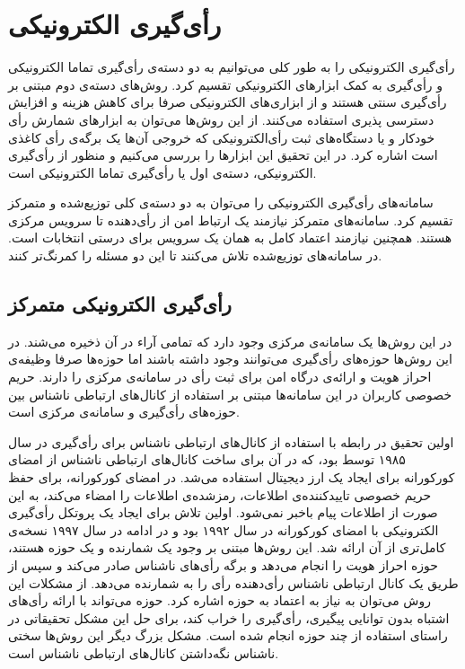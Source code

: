 \section{رأی‌گیری الکترونیکی}
رأی‌گیری الکترونیکی را به طور کلی ‌‌می‌توانیم به دو دسته‌ی رأی‌گیری تماما الکترونیکی و رأی‌گیری به کمک ابزار‌های الکترونیکی تقسیم کرد. روش‌های دسته‌ی دوم مبتنی بر رأی‌گیری سنتی هستند و از ابزاری‌های الکترونیکی صرفا برای کاهش هزینه و افزایش دسترسی پذیری استفاده ‌‌می‌کنند. از این روش‌ها ‌‌می‌توان به ابزارهای شمارش رأی خودکار و یا دستگاه‌های ثبت رأی‌الکترونیکی که خروجی آن‌ها یک برگه‌ی رأی‌ کاغذی
است اشاره کرد. در این تحقیق این ابزارها را بررسی می‌‌‌کنیم و منظور از رأی‌گیری الکترونیکی، دسته‌ی اول یا رأی‌گیری تماما الکترونیکی است.
\par
سامانه‌های رأی‌گیری الکترونیکی را می‌توان به دو د‌سته‌ی کلی توزیع‌شده و متمرکز تقسیم کرد. سامانه‌های متمرکز نیازمند یک ارتباط امن از رأی‌دهنده تا سرویس مرکزی هستند. همچنین نیازمند اعتماد کامل به همان یک سرویس برای درستی انتخابات است. در سامانه‌های توزیع‌شده تلاش می‌کنند تا این دو مسئله را کمرنگ‌تر کنند.

\subsection{رأی‌گیری الکترونیکی متمرکز}
در این روش‌ها یک سامانه‌ی مرکزی وجود دارد که تمامی آراء در آن ذخیره می‌شند. در این روش‌ها حوزه‌های رأی‌گیری می‌توانند وجود داشته باشند اما حوزه‌ها صرفا وظیفه‌ی احراز هویت و ارائه‌ی درگاه امن برای ثبت رأی در سامانه‌ی مرکزی را دارند. حریم خصوصی کاربران در این سامانه‌ها مبتنی بر استفاده از کانال‌های ارتباطی ناشناس 
بین حوزه‌های رأی‌گیری و سامانه‌ی مرکزی است.
\par
اولین تحقیق در رابطه با استفاده‌ از کانال‌های ارتباطی ناشناس برای رأی‌گیری در سال ۱۹۸۵ توسط 
\cite{Chaum}
بود، که در آن برای ساخت‌ کانال‌های ارتباطی ناشناس از امضای کورکورانه 
\cite{blindsig}
برای ایجاد یک ارز دیجیتال استفاده می‌شد. در امضای کورکورانه، برای حفظ حریم خصوصی تاییدکننده‌ی اطلاعات، رمزشده‌ی اطلاعات را امضاء می‌کند، به این صورت از اطلاعات پیام باخبر نمی‌شود. اولین تلاش برای ایجاد یک پروتکل رأی‌گیری الکترونیکی با امضای کورکورانه در سال ۱۹۹۲ 
\cite{foo92}
بود و در ادامه در سال ۱۹۹۷
\cite{improveblind}
نسخه‌ی کامل‌تری از آن ارائه شد. این روش‌ها مبتنی بر وجود یک شمارنده و یک حوزه هستند، حوزه احراز هویت را انجام می‌دهد و برگه‌ رأی‌های ناشناس صادر می‌کند و سپس از طریق یک کانال ارتباطی ناشناس رأی‌دهنده رأی را به شمارنده می‌دهد. از مشکلات این روش می‌توان به نیاز به اعتماد به حوزه اشاره کرد. ‌‌حوزه می‌تواند با ارائه رأی‌های اشتباه بدون توانایی پیگیری، رأی‌گیری را خراب کند، برای حل این مشکل تحقیقاتی
\cite{multiteller}
در راستای استفاده از چند حوزه انجام شده است. مشکل بزرگ دیگر این روش‌ها
\cite{anonchan}
سختی ناشناس نگه‌داشتن کانال‌های ارتباطی ناشناس است.

